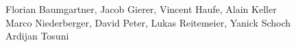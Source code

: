 %
%
%
Florian Baumgartner,	%
Jacob Gierer,		%
Vincent Haufe,		%
Alain Keller		%
\\
Marco Niederberger,	%
David Peter,		%
Lukas Reitemeier,	%
Yanick Schoch		%
\\
Ardijan Tosuni		%

